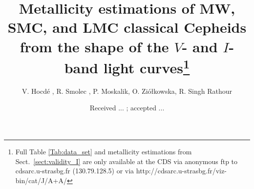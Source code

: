 \documentclass[article]{aa} %
\begin{document}
\title{Metallicity estimations of MW, SMC, and LMC classical Cepheids from the shape of the $V$- and $I$-band light curves\thanks{Full Table \ref{Tab:data_set} and metallicity estimations from Sect.~\ref{sect:validity_I} are only available at the CDS via anonymous ftp to cdsarc.u-strasbg.fr (130.79.128.5) or via
http://cdsarc.u-strasbg.fr/viz-bin/cat/J/A+A/}}


\author{V. Hocd\'e , R. Smolec , P. Moskalik, O. Zi\'ołkowska, R. Singh Rathour}


\date{Received ... ; accepted ...}
\end{document}
